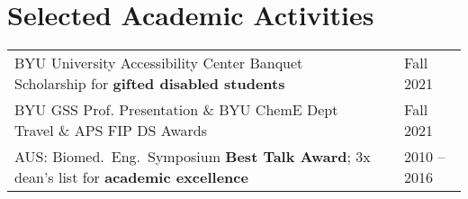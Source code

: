 \documentclass[letterpaper,11pt]{article}
\begin{document}

\vspace{-0.2cm}
\section*{Selected Academic Activities}
\begin{tabular}{@{}p{} p{} l@{}}
  BYU University Accessibility Center Banquet Scholarship for \textbf{gifted disabled students}            & & Fall 2021 \\[4pt]
  BYU GSS Prof. Presentation \& BYU ChemE Dept Travel \& APS FIP DS Awards                             & & Fall 2021 \\[4pt]
  AUS: Biomed.\ Eng.\ Symposium \textbf{Best Talk Award}; 3x dean's list for \textbf{academic excellence}  & & 2010 -- 2016\\[4pt]

\end{tabular}
\end{document}
